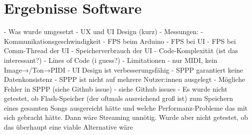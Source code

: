 
\chapter{Ergebnisse Software} \label{ergebnisseSW}

\nocite{*}

- Was wurde umgesetzt \newline
- UX und UI Design (kurz) \newline
- Messungen: \newline
	- Kommunikationsgeschwindigkeit \newline
	- FPS beim Arduino \newline
	- FPS bei UI \newline
	- FPS bei Comm-Thread der UI \newline
	- Speicherverbrauch der UI \newline
	- Code-Komplexität (ist das interessant?) \newline
	- Lines of Code (i guess?) \newline
- Limitationen \newline
	- nur MIDI, kein Image→/Ton→PIDI \newline
	- UI Design ist verbesserungsfähig \newline
	- SPPP garantiert keine Datenkonsistenz \newline
	- SPPP ist nicht auf mehrere Nutzer:innen ausgelegt \newline
	- Mögliche Fehler in SPPP (siehe Github issue) \newline
	- siehe Github issues \newline
	- Es wurde nicht getestet, ob Flash-Speicher (der oftmals ausreichend groß ist) zum Speichern eines gesamten Songs ausgereicht hätte und welche Performanz-Probleme das mit sich gebracht hätte. Dann wäre Streaming unnötig. Wurde aber nicht getestet, ob das überhaupt eine viable Alternative wäre \newline